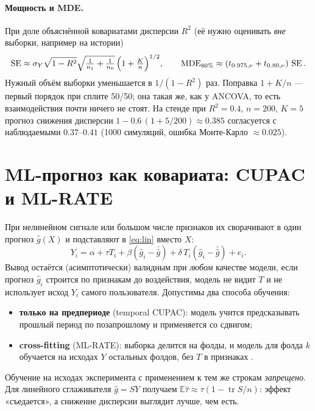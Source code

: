 \documentclass[10pt,a4paper]{article}
\newcommand{\E}{\mathbb{E}}
\newcommand{\SE}{\operatorname{SE}}
\begin{document}
\paragraph{Мощность и MDE.} При доле объяснённой ковариатами дисперсии $R^2$ (её нужно оценивать \emph{вне}
выборки, например на истории)
\[
\SE\approx\sigma_Y\sqrt{1-R^2}\sqrt{\tfrac1{n_1}+\tfrac1{n_0}}\,\Bigl(1+\tfrac{K}{n}\Bigr)^{1/2},\qquad
\text{MDE}_{80\%}\approx(t_{0.975,\nu}+t_{0.80,\nu})\,\SE .
\]
Нужный объём выборки уменьшается в $1/(1-R^2)$ раз. Поправка $1+K/n$ --- первый порядок при сплите 50/50; она
такая же, как у ANCOVA, то есть взаимодействия почти ничего не стоят. На стенде при $R^2=0.4$, $n=200$, $K=5$
прогноз снижения дисперсии $1-0.6\,(1+5/200)\approx0.385$ согласуется с наблюдаемыми $0.37$--$0.41$
(1000 симуляций, ошибка Монте-Карло $\approx0.025$).

\section{ML-прогноз как ковариата: CUPAC и ML-RATE}\label{sec:ml}

При нелинейном сигнале или большом числе признаков их сворачивают в один прогноз $\hat g(X)$
\citep{poyarkov2016, doordash2020cupac, guo2021mlrate} и подставляют в \eqref{eq:lin} вместо $X$:
\[
Y_i=\alpha+\tau T_i+\beta(\hat g_i-\bar{\hat g})+\delta\,T_i(\hat g_i-\bar{\hat g})+e_i .
\]
Вывод остаётся (асимптотически) валидным при \emph{любом} качестве модели, если прогноз $\hat g_i$ строится по
признакам до воздействия, модель не видит $T$ и не использует исход $Y_i$ самого пользователя.
Допустимы два способа обучения:
\begin{itemize}
  \item \textbf{только на предпериоде} (temporal CUPAC): модель учится предсказывать прошлый период по
        позапрошлому и применяется со сдвигом;
  \item \textbf{cross-fitting} (ML-RATE): выборка делится на фолды, и модель для фолда $k$ обучается на исходах
        $Y$ остальных фолдов, без $T$ в признаках \citep{chernozhukov2018dml}.
\end{itemize}
Обучение на исходах эксперимента с применением к тем же строкам \emph{запрещено}. Для линейного сглаживателя
$\hat g=SY$ получаем $\E\hat\tau\approx\tau(1-\operatorname{tr}S/n)$: эффект «съедается», а снижение
дисперсии выглядит лучше, чем есть.
\end{document}
